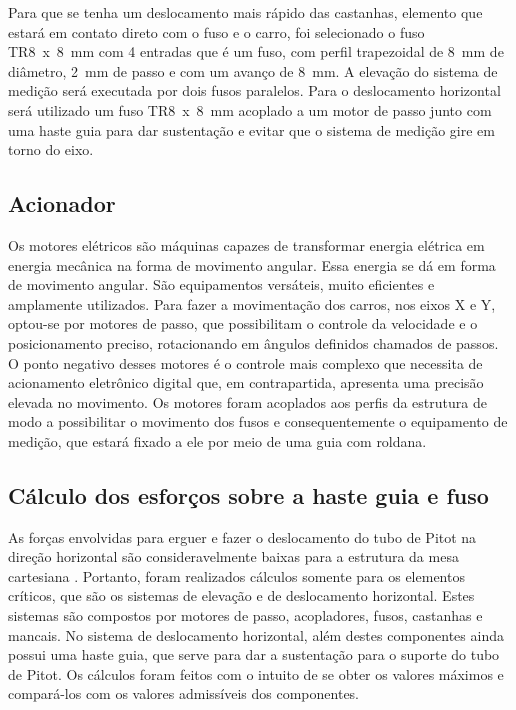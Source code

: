Para que se tenha um deslocamento mais rápido das castanhas, elemento que estará em contato 
direto com o fuso e o carro, foi selecionado o fuso TR8~x~8~mm com 4 entradas que é um fuso, com perfil 
trapezoidal de 8~mm de diâmetro, 2~mm de passo e com um avanço de 8~mm. A elevação do sistema de medição será 
executada por dois fusos paralelos. Para o deslocamento horizontal será utilizado um fuso TR8~x~8~mm 
acoplado a um motor de passo junto com uma haste guia para dar sustentação e evitar que o sistema 
de medição gire em torno do eixo.

\subsection{Acionador}\label{subsec:metacionador}

Os motores elétricos são máquinas capazes de transformar energia elétrica em energia mecânica 
na forma de movimento angular. Essa energia se dá em forma de movimento angular. 
São equipamentos versáteis, muito eficientes e amplamente utilizados. Para fazer a movimentação dos carros, 
nos eixos X e Y, optou-se por motores de passo, que possibilitam o controle da velocidade 
e o posicionamento preciso, rotacionando em ângulos definidos chamados de passos. 
O ponto negativo desses motores é o controle mais complexo que necessita de acionamento eletrônico 
digital que, em contrapartida, apresenta uma precisão elevada no movimento. Os motores 
foram acoplados aos perfis da estrutura de modo a possibilitar o movimento dos fusos e consequentemente 
o equipamento de medição, que estará fixado a ele por meio de uma guia com roldana. 

\subsection{Cálculo dos esforços sobre a haste guia e fuso}\label{subsec:metcalculos}

As forças envolvidas para erguer  e fazer o deslocamento do tubo de Pitot na direção horizontal são 
consideravelmente baixas para a estrutura da mesa cartesiana . Portanto, foram realizados cálculos 
somente para os elementos críticos, que são os sistemas de elevação e de deslocamento 
horizontal. Estes sistemas são compostos por motores de passo, acopladores, fusos, castanhas e mancais. 
No sistema de deslocamento horizontal, além destes componentes ainda possui uma haste guia, 
que serve para dar a sustentação para o suporte do tubo de Pitot. Os cálculos foram feitos com 
o intuito de se obter os valores máximos e compará-los com os valores admissíveis dos componentes.

